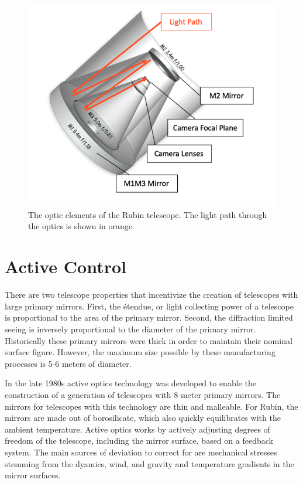 \begin{figure}[hbt!]
\centering
\includegraphics[width=14cm, keepaspectratio]{figs/rubin_telescope_and_aos/telescope.png}
\caption[Rubin Optics]{The optic elements of the Rubin telescope. The light path through the optics is shown in orange.}
\label{fig:telescope}
\end{figure}

\section{Active Control}

There are two telescope properties that incentivize the creation of telescopes with large primary mirrors. First, the \'{e}tendue, or light collecting power of a telescope is proportional to the area of the primary mirror. Second, the diffraction limited seeing is inversely proportional to the diameter of the primary mirror. Historically these primary mirrors were thick in order to maintain their nominal surface figure. However, the maximum size possible by these manufacturing processes is 5-6 meters of diameter.

In the late 1980s active optics technology was developed to enable the construction of a generation of telescopes with 8 meter primary mirrors. The mirrors for telescopes with this technology are thin and malleable. For Rubin, the mirrors are made out of borosilicate, which also quickly equilibrates with the ambient temperature. Active optics works by actively adjusting degrees of freedom of the telescope, including the mirror surface, based on a feedback system. The main sources of deviation to correct for are mechanical stresses stemming from the dyamics, wind, and gravity and temperature gradients in the mirror surfaces.

